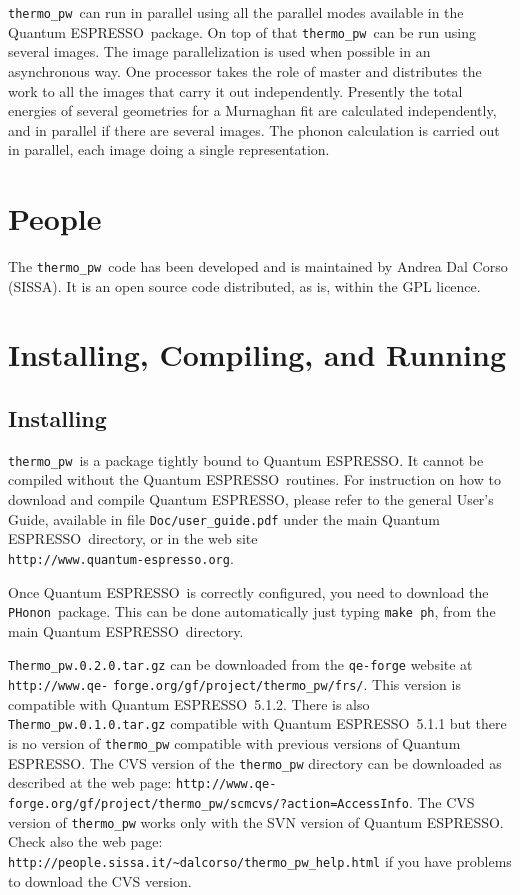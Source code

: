 \documentclass[12pt,a4paper]{article}
\def\qe{{\sc Quantum ESPRESSO}}
\def\PHonon{\texttt{PHonon}}
\def\thermo{\texttt{thermo\_pw}}
\begin{document}
\thermo\ can run in parallel using all the parallel modes available in
the \qe\ package. On top of that \thermo\ can be run using several images.
The image parallelization is used when possible in an asynchronous way.
One processor takes the role of master and distributes the work 
to all the images that carry it out independently. Presently 
the total energies of several geometries for a Murnaghan fit are
calculated independently, and in parallel if there are several images.  
The phonon calculation is carried out in parallel, each image doing 
a single representation.

\section{People}
The \thermo\ code has been developed and is maintained by Andrea Dal Corso 
(SISSA). It is an open source code distributed, as is, within the GPL
licence.  

\section{Installing, Compiling, and Running}

\subsection{Installing}

\thermo\ is a package tightly bound to \qe. It cannot be compiled without
the \qe\ routines. For instruction on how to download and compile \qe, please 
refer to the general User's Guide, available in file \texttt{Doc/user\_guide.pdf}
under the main \qe\ directory, or in the web site \\
\texttt{http://www.quantum-espresso.org}.

Once \qe\ is correctly configured, you need to download the \PHonon\ 
package. This can be done automatically just typing \texttt{make ph}, from 
the main \qe\ directory.

\texttt{Thermo\_pw.0.2.0.tar.gz} can be downloaded from the 
\texttt{qe-forge} website at \texttt{http://www.qe-} 
\texttt{forge.org/gf/project/thermo\_pw/frs/}. This version is 
compatible with \qe\ 5.1.2. There is also \texttt{Thermo\_pw.0.1.0.tar.gz}
compatible with \qe\ 5.1.1 but there is no version of \texttt{thermo\_pw} 
compatible with previous versions of \qe.
The CVS version of the \texttt{thermo\_pw} directory can be downloaded as 
described at
the web page: \texttt{http://www.qe-} \texttt{forge.org/gf/project/thermo\_pw/scmcvs/?action=AccessInfo}.
The CVS version of \texttt{thermo\_pw} works only with the SVN version of \qe. 
Check also the web page:
\texttt{http://people.sissa.it/\textasciitilde dalcorso/thermo\_pw\_help.html} if you
have problems to download the CVS version.
\end{document}

